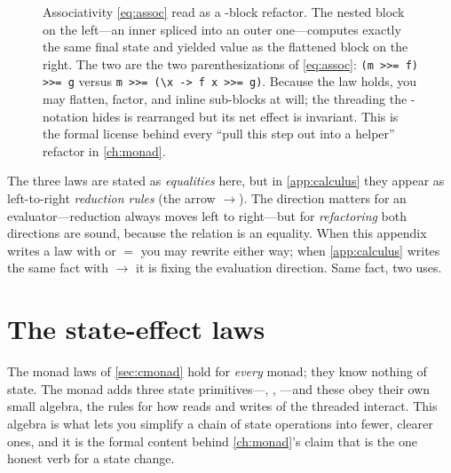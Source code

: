 \begin{figure}[t]
\caption[A monad law as a \texttt{do}-block rewrite]{Associativity \eqref{eq:assoc}
read as a -block refactor. The nested block on the left---an inner
 spliced into an outer one---computes exactly the same final state and
yielded value as the flattened block on the right. The two are the two
parenthesizations of \eqref{eq:assoc}: \lstinline[style=l4style]|(m >>= f) >>= g|
versus \lstinline[style=l4style]|m >>= (\x -> f x >>= g)|. Because the law holds, you
may flatten, factor, and inline sub-blocks at will; the threading the
-notation hides is rearranged but its net effect is invariant. This is the
formal license behind every ``pull this step out into a helper'' refactor in
\cref{ch:monad}.}
\label{fig:monadlaw}
\end{figure}

\begin{notationbox}
The three laws are stated as \emph{equalities} here, but in \cref{app:calculus} they
appear as left-to-right \emph{reduction rules} (the arrow $\to$). The direction
matters for an evaluator---reduction always moves left to right---but for
\emph{refactoring} both directions are sound, because the relation is an equality.
When this appendix writes a law with \code{=} or $=$ you may rewrite either way; when
\cref{app:calculus} writes the same fact with $\to$ it is fixing the evaluation
direction. Same fact, two uses.
\end{notationbox}

\section{The state-effect laws}
\label{sec:cstate}

The monad laws of \cref{sec:cmonad} hold for \emph{every} monad; they know nothing of
state. The  monad adds three state primitives---, ,
---and these obey their own small algebra, the rules for how reads and
writes of the threaded  interact. This algebra is what lets you
simplify a chain of state operations into fewer, clearer ones, and it is the formal
content behind \cref{ch:monad}'s claim that  is the one honest verb for
a state change.

